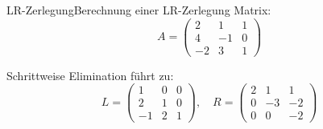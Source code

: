 \begin{example2}{LR-Zerlegung}{Berechnung einer LR-Zerlegung}
Matrix:
$$A = \begin{pmatrix}
2 & 1 & 1\\
4 & -1 & 0\\
-2 & 3 & 1
\end{pmatrix}$$

Schrittweise Elimination führt zu:
$$L = \begin{pmatrix}
1 & 0 & 0\\
2 & 1 & 0\\
-1 & 2 & 1
\end{pmatrix}, \quad
R = \begin{pmatrix}
2 & 1 & 1\\
0 & -3 & -2\\
0 & 0 & -2
\end{pmatrix}$$
\end{example2}

